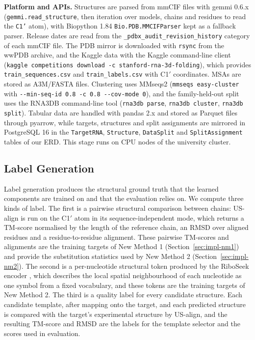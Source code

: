 \documentclass{FastFyp}
\begin{document}
\textbf{Platform and APIs.} Structures are parsed from mmCIF files with gemmi 0.6.x (\texttt{gemmi.read\_structure}, then iteration over models, chains and residues to read the \texttt{C1'} atom), with Biopython 1.84 \texttt{Bio.PDB.MMCIFParser} kept as a fallback parser. Release dates are read from the \texttt{\_pdbx\_audit\_revision\_history} category of each mmCIF file. The PDB mirror is downloaded with \texttt{rsync} from the wwPDB archive, and the Kaggle data with the Kaggle command-line client (\texttt{kaggle competitions download -c stanford-rna-3d-folding}), which provides \texttt{train\_sequences.csv} and \texttt{train\_labels.csv} with C1$'$ coordinates. MSAs are stored as A3M/FASTA files. Clustering uses MMseqs2 \cite{steinegger2017} (\texttt{mmseqs easy-cluster} with \texttt{-{}-min-seq-id 0.8 -c 0.8 -{}-cov-mode 0}), and the family-held-out split uses the RNA3DB command-line tool (\texttt{rna3db parse}, \texttt{rna3db cluster}, \texttt{rna3db split}). Tabular data are handled with pandas 2.x and stored as Parquet files through pyarrow, while targets, structures and split assignments are mirrored in PostgreSQL 16 in the \texttt{TargetRNA}, \texttt{Structure}, \texttt{DataSplit} and \texttt{SplitAssignment} tables of our ERD. This stage runs on CPU nodes of the university cluster.

\subsection{Label Generation}
\label{sec:impl-labels}
Label generation produces the structural ground truth that the learned components are trained on and that the evaluation relies on. We compute three kinds of label. The first is a pairwise structural comparison between chains: US-align is run on the C1$'$ atom in its sequence-independent mode, which returns a TM-score normalised by the length of the reference chain, an RMSD over aligned residues and a residue-to-residue alignment. These pairwise TM-scores and alignments are the training targets of New Method 1 (Section~\ref{sec:impl-nm1}) and provide the substitution statistics used by New Method 2 (Section~\ref{sec:impl-nm2}). The second is a per-nucleotide structural token produced by the RiboSeek encoder \cite{wang2026riboseek}, which describes the local spatial neighbourhood of each nucleotide as one symbol from a fixed vocabulary, and these tokens are the training targets of New Method 2. The third is a quality label for every candidate structure. Each candidate template, after mapping onto the target, and each predicted structure is compared with the target's experimental structure by US-align, and the resulting TM-score and RMSD are the labels for the template selector and the scores used in evaluation.
\end{document}
